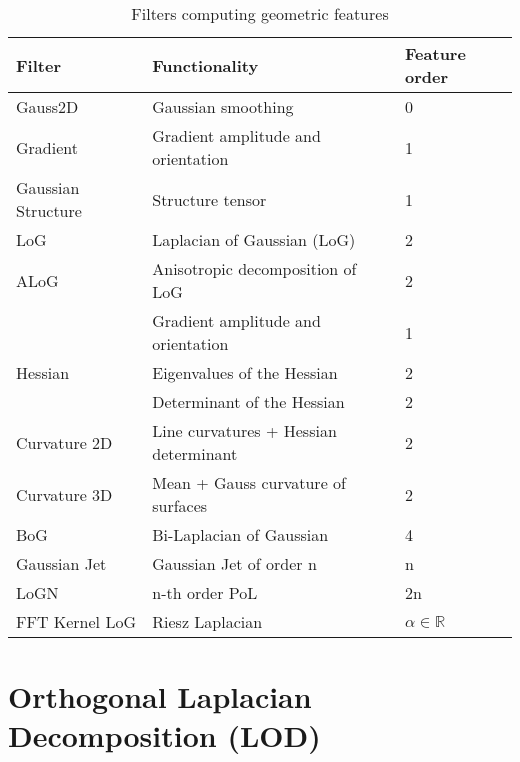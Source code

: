 \documentclass{amsart}
\begin{document}
\begin{table*}[pt]
	\centering
	\begin{tabular}{lll}
		\hline
		Filter			   & Functionality & Feature order\\
		\hline
		Gauss2D			   & Gaussian smoothing  & 0 \\
		Gradient		   & Gradient  amplitude and orientation & 1\\
		Gaussian Structure & Structure tensor  & 1  \\
		LoG  			   & Laplacian of Gaussian (LoG) & 2 \\
		ALoG   			   & Anisotropic decomposition of LoG  & 2 \\
		& Gradient amplitude and orientation & 1\\
		Hessian 		   & Eigenvalues of the Hessian & 2 \\
		& Determinant of the Hessian & 2 \\
		Curvature 2D 	   & Line curvatures + Hessian determinant & 2\\
		Curvature 3D 	   & Mean + Gauss curvature of surfaces & 2\\
		BoG   			   & Bi-Laplacian of Gaussian & 4 \\ 
		Gaussian Jet	   & Gaussian Jet of order n & n\\
		LoGN 			   & n-th order PoL  & 2n \\ 
		FFT Kernel LoG	   & Riesz Laplacian  & $\alpha \in \mathbb{R}$ \\
		\hline
	\end{tabular}
	\caption{Filters computing geometric features\cite{Vohra2021}}\label{tab:filters}	
\end{table*}

\section{Orthogonal Laplacian Decomposition (LOD)}\label{sec:lapdecomp}
\end{document}
